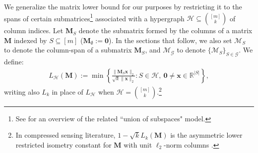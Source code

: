 \documentclass[journal, twocolumn]{IEEEtran}
\begin{document}
We generalize the matrix lower bound for our purposes by restricting it to the spans of certain submatrices\footnote{See \cite{vidal2005generalized} for an overview of the related ``union of subspaces" model.} associated with a hypergraph $\mathcal{H} \subseteq {[m] \choose k}$ of column indices. Let $\mathbf{M}_S$ denote the submatrix formed by the columns of a matrix $\mathbf{M}$ indexed by $S \subseteq [m]$ ($\mathbf{M}_\emptyset := \mathbf{0}$).  In the sections that follow, we also set $\bm{\mathcal{M}}_S$ to denote the column-span of a submatrix $\mathbf{M}_S$, and $\bm{\mathcal{M}}_\mathcal{G}$ to denote $\{\bm{\mathcal{M}}_S\}_{S \in \mathcal{G}}$.  We define:  %
%
\begin{align}\label{Ldef}
L_\mathcal{H}(\mathbf{M}) := \min \left\{ \frac{\|\mathbf{M}_S\mathbf{x}\|_2}{ \sqrt{k} \|\mathbf{x}\|_2} : S \in \mathcal{H}, \ \mathbf{0} \neq \mathbf{x} \in \mathbb{R}^{|S|} \right\},
\end{align} 
%
writing also $L_{k}$ in place of $L_\mathcal{H}$ when $\mathcal{H} = {[m] \choose k}$.\footnote{In compressed sensing literature, \mbox{$1 - \sqrt{k} L_k(\mathbf{M})$}  is the asymmetric lower restricted isometry constant for $\mathbf{M}$ with unit $\ell_2$-norm columns \cite{Blanchard2011}.} 
\end{document}
